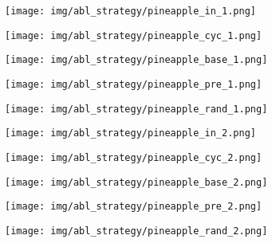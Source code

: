 \documentclass[10pt,twocolumn,letterpaper]{article}
\begin{document}
\newcommand{\strwidth}{0.19} 
\begin{figure}[tbp]
\captionsetup[subfigure]{labelformat=empty}
\begin{center}
  \begin{subfigure}[b]{\strwidth\linewidth}
  \texttt{[image: img/abl\_strategy/pineapple\_in\_1.png]}
  \end{subfigure}
  \begin{subfigure}[b]{\strwidth\linewidth}
  \texttt{[image: img/abl\_strategy/pineapple\_cyc\_1.png]}
  \end{subfigure}
  \begin{subfigure}[b]{\strwidth\linewidth}
  \texttt{[image: img/abl\_strategy/pineapple\_base\_1.png]}
  \end{subfigure}
   \begin{subfigure}[b]{\strwidth\linewidth}
  \texttt{[image: img/abl\_strategy/pineapple\_pre\_1.png]}
  \end{subfigure}
\begin{subfigure}[b]{\strwidth\linewidth}
  \texttt{[image: img/abl\_strategy/pineapple\_rand\_1.png]}
  \end{subfigure}
  
  \begin{subfigure}[b]{\strwidth\linewidth}
  \texttt{[image: img/abl\_strategy/pineapple\_in\_2.png]}
  \end{subfigure}
   \begin{subfigure}[b]{\strwidth\linewidth}
  \texttt{[image: img/abl\_strategy/pineapple\_cyc\_2.png]}
  \end{subfigure} 
  \begin{subfigure}[b]{\strwidth\linewidth}
  \texttt{[image: img/abl\_strategy/pineapple\_base\_2.png]}
  \end{subfigure}
   \begin{subfigure}[b]{\strwidth\linewidth}
  \texttt{[image: img/abl\_strategy/pineapple\_pre\_2.png]}
  \end{subfigure}
\begin{subfigure}[b]{\strwidth\linewidth}
  \texttt{[image: img/abl\_strategy/pineapple\_rand\_2.png]}
  \end{subfigure}


\end{center}
\end{figure}
\end{document}
